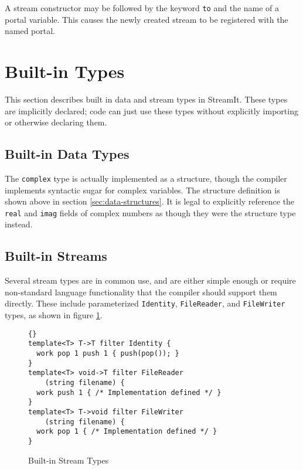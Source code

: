 \documentclass[11pt]{article}
\begin{document}
A stream constructor may be followed by the keyword \lstinline|to| and
the name of a portal variable.  This causes the newly created stream
to be registered with the named portal.

\section{Built-in Types}

This section describes built in data and stream types in StreamIt.
These types are implicitly declared; code can just use these types
without explicitly importing or otherwise declaring them.

\subsection{Built-in Data Types}

The \lstinline|complex| type is actually implemented as a structure,
though the compiler implements syntactic sugar for complex variables.
The structure definition is shown above in section
\ref{sec:data-structures}.
It is legal to explicitly reference the \lstinline|real| and
\lstinline|imag| fields of complex numbers as though they were the
structure type instead.

\subsection{Built-in Streams}

Several stream types are in common use, and are either simple enough
or require non-standard language functionality that the compiler
should support them directly.  These include parameterized
\lstinline|Identity|, \lstinline|FileReader|, and \lstinline|FileWriter| types, as
shown in figure \ref{fig:built-in-streams}.

\begin{figure}[htbp]
    \begin{lstlisting}{}
template<T> T->T filter Identity {
  work pop 1 push 1 { push(pop()); }
}
template<T> void->T filter FileReader
    (string filename) {
  work push 1 { /* Implementation defined */ }
}
template<T> T->void filter FileWriter
    (string filename) {
  work pop 1 { /* Implementation defined */ }
}
\end{lstlisting}
\vspace{-12pt}
    \caption{Built-in Stream Types}
    \label{fig:built-in-streams}
\end{figure}
\end{document}
